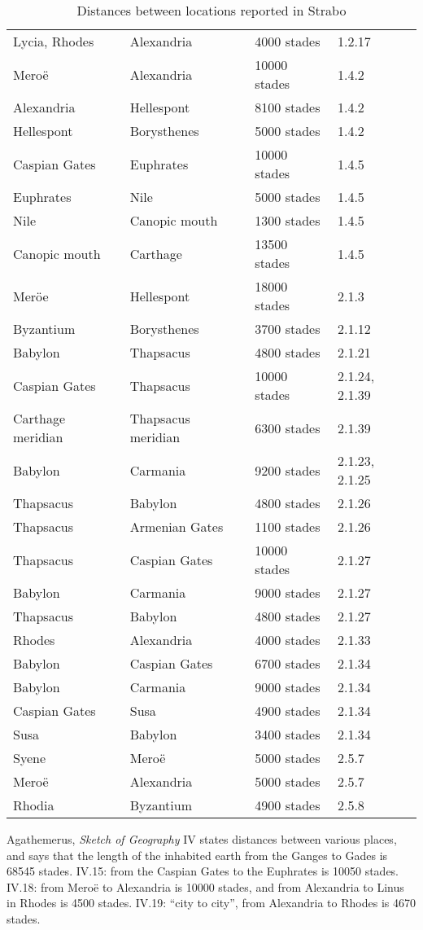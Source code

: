 \documentclass{amsart}
\theoremstyle{definition}
\begin{document}
\begin{table}[h!]
\caption{Distances between locations reported in Strabo}
\label{distances}
\begin{tabular}{l l l l}
Lycia, Rhodes&Alexandria&4000 stades&1.2.17\\
Mero\"e&Alexandria&10000 stades&1.4.2\\
Alexandria&Hellespont&8100 stades&1.4.2\\
Hellespont&Borysthenes&5000 stades&1.4.2\\
Caspian Gates&Euphrates&10000 stades&1.4.5\\
Euphrates&Nile&5000 stades&1.4.5\\
Nile&Canopic mouth&1300 stades&1.4.5\\
Canopic mouth&Carthage&13500 stades&1.4.5\\
Mer\"oe&Hellespont&18000 stades&2.1.3\\
Byzantium&Borysthenes&3700 stades&2.1.12\\
Babylon&Thapsacus&4800 stades&2.1.21\\
Caspian Gates&Thapsacus&10000 stades&2.1.24, 2.1.39\\
Carthage meridian&Thapsacus meridian&6300 stades&2.1.39\\
Babylon&Carmania&9200 stades&2.1.23, 2.1.25\\
Thapsacus&Babylon&4800 stades&2.1.26\\
Thapsacus&Armenian Gates&1100 stades&2.1.26\\
Thapsacus&Caspian Gates&10000 stades&2.1.27\\
Babylon&Carmania&9000 stades&2.1.27\\
Thapsacus&Babylon&4800 stades&2.1.27\\
Rhodes&Alexandria&4000 stades&2.1.33\\
Babylon&Caspian Gates&6700 stades&2.1.34\\
Babylon&Carmania&9000 stades&2.1.34\\
Caspian Gates&Susa&4900 stades&2.1.34\\
Susa&Babylon&3400 stades&2.1.34\\
Syene&Mero\"e&5000 stades&2.5.7\\
Mero\"e&Alexandria&5000 stades&2.5.7\\
Rhodia&Byzantium&4900 stades&2.5.8
\end{tabular}
\end{table}




Agathemerus, {\em Sketch of Geography} IV \cite[pp.~69--70]{agathemerus}
states distances  between various places, and says that
the length of the inhabited earth from the Ganges to Gades is 68545 stades. IV.15: 
from the Caspian Gates
to the Euphrates is 10050 stades. IV.18: from Mero\"e to Alexandria is 10000 stades, 
and from Alexandria to Linus in Rhodes is 4500 stades.
IV.19: ``city to city'', from Alexandria to Rhodes is 4670 stades.
\end{document}
